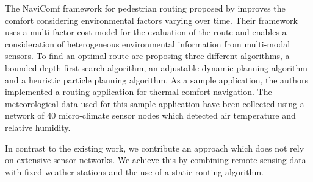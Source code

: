 The NaviComf framework for pedestrian routing proposed by \textcite{Dang2013} improves the comfort considering environmental factors varying over time. Their  framework uses a multi-factor cost model for the evaluation of the route and enables a consideration of heterogeneous environmental information from multi-modal sensors. To find an optimal route \textcite{Dang2013} are proposing three different algorithms, a bounded depth-first search algorithm, an adjustable dynamic planning algorithm and a heuristic particle planning algorithm. As a sample application, the authors implemented a routing application for thermal comfort navigation. The meteorological data used for this sample application have been collected using a network of 40 micro-climate sensor nodes which detected air temperature and relative humidity. 

In contrast to the existing work, we contribute an approach which does not rely on extensive sensor networks. We achieve this by combining remote sensing data with fixed weather stations and the use of a static routing algorithm.